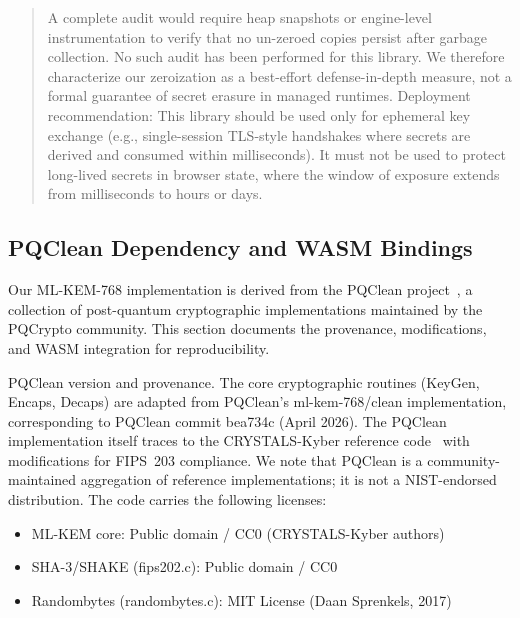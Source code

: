 \documentclass[11pt,a4paper]{article}
\def\textbf#1{#1}%
\def\texttt#1{#1}%
\def\emph#1{#1}%
\begin{document}
\begin{quote}
A complete audit would require heap snapshots or engine-level instrumentation to verify that no un-zeroed copies persist after garbage collection. \textbf{No such audit has been performed for this library.} We therefore characterize our zeroization as a \emph{best-effort defense-in-depth} measure, not a formal guarantee of secret erasure in managed runtimes. \textbf{Deployment recommendation:} This library should be used only for ephemeral key exchange (e.g., single-session TLS-style handshakes where secrets are derived and consumed within milliseconds). It must \textbf{not} be used to protect long-lived secrets in browser state, where the window of exposure extends from milliseconds to hours or days.
\end{quote}

\subsection{PQClean Dependency and WASM Bindings}
\label{subsec:pqclean}

Our ML-KEM-768 implementation is derived from the PQClean project~\cite{pqclean}, a collection of post-quantum cryptographic implementations maintained by the PQCrypto community. This section documents the provenance, modifications, and WASM integration for reproducibility.

\textbf{PQClean version and provenance.} The core cryptographic routines (KeyGen, Encaps, Decaps) are adapted from PQClean's \texttt{ml-kem-768/clean} implementation, corresponding to PQClean commit \texttt{bea734c} (April 2026). The PQClean implementation itself traces to the CRYSTALS-Kyber reference code~\cite{avanzi2021kyber} with modifications for FIPS~203 compliance. We note that PQClean is a community-maintained aggregation of reference implementations; it is not a NIST-endorsed distribution. The code carries the following licenses:
\begin{itemize}
    \item \textbf{ML-KEM core:} Public domain / CC0 (CRYSTALS-Kyber authors)
    \item \textbf{SHA-3/SHAKE (fips202.c):} Public domain / CC0
    \item \textbf{Randombytes (randombytes.c):} MIT License (Daan Sprenkels, 2017)
\end{itemize}
\end{document}
